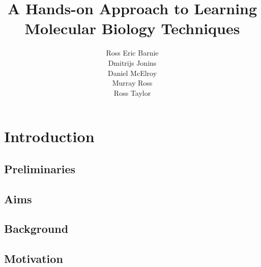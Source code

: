 \documentclass[a4paper]{article}
\title{A Hands-on Approach to Learning Molecular Biology Techniques}
\author{
  Ross Eric Barnie \\
  Dmitrijs Jonins \\
  Daniel McElroy \\
  Murray Ross \\
  Ross Taylor
}
\date{}
\begin{document}
\maketitle
\tableofcontents
\clearpage

\section{Introduction}
\subsection{Preliminaries}

\subsection{Aims}


\subsection{Background}
\subsection{Motivation}

\clearpage


\end{document}
